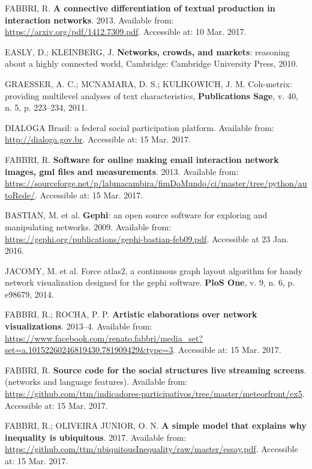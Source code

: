 \documentclass[
12pt,		%
openright,	%
twoside,  %
a4paper,			%
chapter=TITLE,		%
english,			%
french,				%
spanish,			%
brazil				%
]{USPSC}
\begin{document}
\begin{thebibliography}{999}
	FABBRI, R. \textbf{A connective differentiation of textual production in interaction networks}. 2013. Available from: \url{https://arxiv.org/pdf/1412.7309.pdf}. Accessible at: 10 Mar. 2017.

	EASLY, D.; KLEINBERG, J. \textbf{Networks, crowds, and markets}: reasoning about a highly connected world, Cambridge: Cambridge University Press, 2010.

	GRAESSER, A. C.; MCNAMARA, D. S.; KULIKOWICH, J. M. Coh-metrix: providing multilevel analyses of text characteristics, \textbf{Publications Sage}, v. 40, n. 5, p. 223–234, 2011.

	DIALOGA Brasil: a federal social participation platform. Available from: \url{http://dialoga.gov.br}. Accessible at: 15 Mar. 2017.

	FABBRI, R. \textbf{Software for online making email interaction network images, gml files and measurements}. 2013. Available from: \url{https://sourceforge.net/p/labmacambira/fimDoMundo/ci/master/tree/python/autoRede/}. Accessible at: 15 Mar. 2017.

	BASTIAN, M. et al. \textbf{Gephi}: an open source software for exploring and manipulating networks. 2009. Available from: \url{https://gephi.org/publications/gephi-bastian-feb09.pdf}. Accessible at 23 Jan. 2016.

	JACOMY, M. et al. Force atlas2, a continuous graph layout algorithm for handy network visualization designed for the gephi software. \textbf{PloS One}, v. 9, n. 6, p. e98679, 2014.

	FABBRI, R.; ROCHA, P. P. \textbf{Artistic elaborations over network visualizations}. 2013–4. Available from: \url{https://www.facebook.com/renato.fabbri/media_set?set=a.10152260246819430.781909429&type=3}. Accessible at: 15 Mar. 2017.

	FABBRI, R. \textbf{Source code for the social structures live streaming screens}. (networks and language features). Available from: \url{https://github.com/ttm/indicadores-participativos/tree/master/meteorfront/ex5}. Accessible at: 15 Mar. 2017.

	FABBRI, R.; OLIVEIRA JUNIOR, O. N. \textbf{A simple model that explains why inequality is ubiquitous}. 2017. Available from: \url{https://github.com/ttm/ubiquitousInequality/raw/master/essay.pdf}. Accessible at: 15 Mar. 2017.


\end{thebibliography}
\end{document}
